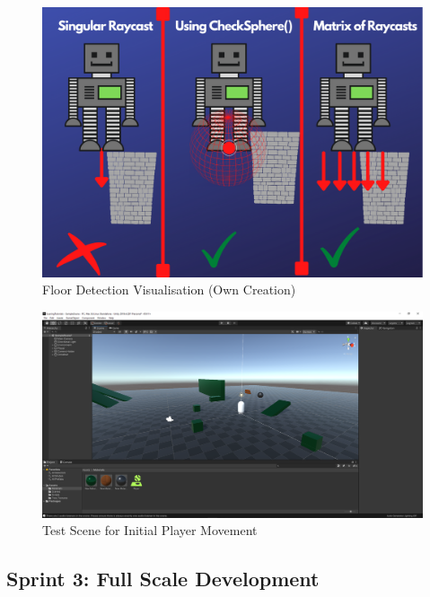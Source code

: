 \begin{figure}[H]
\centering
\includegraphics[scale=0.8]{Figures/floor.png}
\caption{Floor Detection Visualisation (Own Creation)}
\end{figure}

\begin{figure}[H]
\centering
\includegraphics[scale=0.33]{Figures/testold.png}
\caption{Test Scene for Initial Player Movement}
\end{figure}




\subsection{Sprint 3: Full Scale Development}


